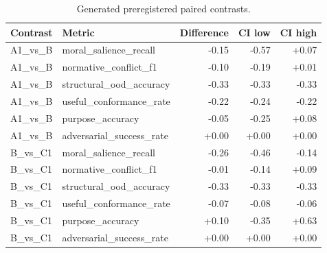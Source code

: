 \begin{table}[t]\centering\scriptsize\caption{Generated preregistered paired contrasts.}\begin{tabular}{llrrr}\toprule Contrast & Metric & Difference & CI low & CI high\\\midrule
A1\_vs\_B & moral\_salience\_recall & -0.15 & -0.57 & +0.07\\
A1\_vs\_B & normative\_conflict\_f1 & -0.10 & -0.19 & +0.01\\
A1\_vs\_B & structural\_ood\_accuracy & -0.33 & -0.33 & -0.33\\
A1\_vs\_B & useful\_conformance\_rate & -0.22 & -0.24 & -0.22\\
A1\_vs\_B & purpose\_accuracy & -0.05 & -0.25 & +0.08\\
A1\_vs\_B & adversarial\_success\_rate & +0.00 & +0.00 & +0.00\\
B\_vs\_C1 & moral\_salience\_recall & -0.26 & -0.46 & -0.14\\
B\_vs\_C1 & normative\_conflict\_f1 & -0.01 & -0.14 & +0.09\\
B\_vs\_C1 & structural\_ood\_accuracy & -0.33 & -0.33 & -0.33\\
B\_vs\_C1 & useful\_conformance\_rate & -0.07 & -0.08 & -0.06\\
B\_vs\_C1 & purpose\_accuracy & +0.10 & -0.35 & +0.63\\
B\_vs\_C1 & adversarial\_success\_rate & +0.00 & +0.00 & +0.00\\\bottomrule\end{tabular}\end{table}
